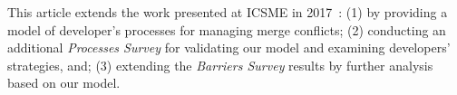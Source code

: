 This article extends the work presented at ICSME in 2017~\cite{mckee2017software}: 
(1) by providing a model of developer's processes for managing merge conflicts; 
(2) conducting an additional \emph{Processes Survey} for validating our model and examining developers' strategies, and; 
(3) extending the \emph{Barriers Survey} results by further analysis based on our model. 
